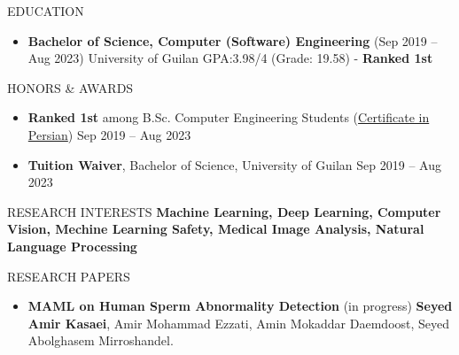 \documentclass[]{CV}
\begin{document}
\resumeheader
{}
{}
{}
{}


\vspace{-3.7mm}
\begin{flushright}
\end{flushright}

\vspace{-6mm}
\begin{section}{EDUCATION}
\begin{itemize}
\item \textbf{Bachelor of Science, Computer (Software) Engineering} \hfill (Sep 2019 -- Aug 2023)\newline
{University of Guilan \newline GPA:3.98/4 (Grade: 19.58) - \textbf{Ranked 1st}}
\end{itemize}
\end{section}


\begin{section}{HONORS \& AWARDS}
\begin{itemize}
\item \textbf{Ranked 1st} among B.Sc. Computer Engineering Students (\href{https://drive.google.com/file/d/1RfuN4xRnWvJ53gFADrlBrSxIEHqgPVWS/view?usp=sharing}{Certificate in Persian}) \hfill Sep 2019 -- Aug 2023 


\item \textbf{Tuition Waiver}, Bachelor of Science, University of Guilan \hfill Sep 2019 -- Aug 2023 
\end{itemize}
\end{section}

\begin{section}{RESEARCH INTERESTS}
    \textbf{Machine Learning, Deep Learning, Computer Vision, Mechine Learning Safety, Medical Image Analysis, Natural Language Processing}
\end{section}

\begin{section}{RESEARCH PAPERS}
\begin{itemize}
\item \textbf{MAML on Human Sperm Abnormality Detection} \hfill (in progress)\newline
\textbf{Seyed Amir Kasaei}, Amir Mohammad  Ezzati, Amin Mokaddar Daemdoost, Seyed Abolghasem Mirroshandel.
\end{itemize}
\end{section}
\end{document}
